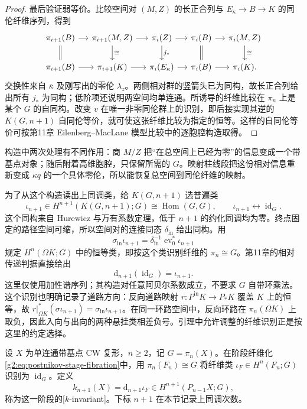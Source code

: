\begin{proof}
	最后验证弱等价。比较空间对 \((M,Z)\) 的长正合列与 \(E_\kappa\to B\to K\) 的同伦纤维序列，得到
	\[
		\begin{tikzcd}[column sep=small]
			\pi_{i+1}(B)\arrow[r]\arrow[d,equal]&\pi_{i+1}(M,Z)\arrow[r]\arrow[d,"\cong"]&\pi_i(Z)\arrow[r]\arrow[d,"j_*"]&\pi_i(B)\arrow[r]\arrow[d,equal]&\pi_i(M,Z)\arrow[d,"\cong"]\\
			\pi_{i+1}(B)\arrow[r]&\pi_{i+1}(K)\arrow[r]&\pi_i(E_\kappa)\arrow[r]&\pi_i(B)\arrow[r]&\pi_i(K).
		\end{tikzcd}
	\]
	交换性来自 \(\bar\kappa\) 及刚写出的零伦 \(\lambda_z\)。两侧相对群的竖箭头已为同构，故长正合列给出所有 \(j_*\) 为同构；低阶项还说明两空间均单连通。所诱导的纤维比较在 \(\pi_n\) 上是某个 \(G\) 的自同构。改变 \(v\) 在唯一非零同伦群上的识别，即后接实现其逆的 \(K(G,n+1)\) 自同伦等价，就可使这张纤维比较为指定的恒等。这样的自同伦等价可按第11章 Eilenberg–MacLane 模型比较中的逐胞腔构造取得。
\end{proof}

构造中两次处理有不同作用：商 \(M/Z\) 把“在总空间上已经为零”的信息变成一个带基点对象；随后附着高维胞腔，只保留所需的 \(G\)。映射柱线段把这份相对信息重新变成 \(\kappa q\) 的一个具体零伦，所以能恢复总空间到同伦纤维的映射。

\ProseParagraphBreak

为了从这个构造读出上同调类，给 \(K(G,n+1)\) 选普遍类
\[
	\iota_{n+1}\in H^{n+1}(K(G,n+1);G)\cong\operatorname{Hom}(G,G),\qquad
	\iota_{n+1}\longleftrightarrow\operatorname{id}_G.
\]
这个同构来自 Hurewicz 与万有系数定理，低于 \(n+1\) 的约化同调均为零。终点固定的路径空间可缩，所以空间对的连接同态 \(\delta_{\mathrm{in}}\) 给出同构。用
\[
	\sigma_{\mathrm{in}}\iota_{n+1}=\delta_{\mathrm{in}}^{-1}\operatorname{ev}_0^*\iota_{n+1}
\]
规定 \(H^n(\Omega K;G)\) 中的恒等类，即按这个类识别纤维的 \(\pi_n\cong G\)。第11章的相对传递判据直接给出
\[
	\mathrm d_{n+1}(\operatorname{id}_G)=\iota_{n+1}.
\]
这里仅使用加性谱序列；其构造对任意阿贝尔系数成立，不要求 \(G\) 自带环乘法。这个识别也明确记录了道路方向：反向道路映射 \(r:P^{\mathrm{in}}K\to P_*K\) 覆盖 \(K\) 上的恒等，故 \(r|_{\Omega K}^*(\sigma\iota_{n+1})=\sigma_{\mathrm{in}}\iota_{n+1}\)。在同一环路空间中，反向环路在 \(\pi_n(\Omega K)\) 上取负，因此入向与出向的两种悬挂类相差负号。引理中允许调整的纤维识别正是按这里的约定选择。

\begin{definition}\label{g2:def:postnikov-k-invariant}
	设 \(X\) 为单连通带基点 CW 复形，\(n\ge2\)，记 \(G=\pi_n(X)\)。在阶段纤维化\eqref{g2:eq:postnikov-stage-fibration}中，用 \(\pi_n(F_n)\cong G\) 将纤维类 \(\iota_F\in H^n(F_n;G)\) 识别为 \(\operatorname{id}_G\)。定义
	\begin{equation}\label{g2:eq:postnikov-k-transgression}
		k_{n+1}(X)=\mathrm d_{n+1}\iota_F\in H^{n+1}(P_{n-1}X;G),
	\end{equation}
	称为这一阶段的[\(k\)-invariant]。下标 \(n+1\) 在本节记录上同调次数。
\end{definition}

